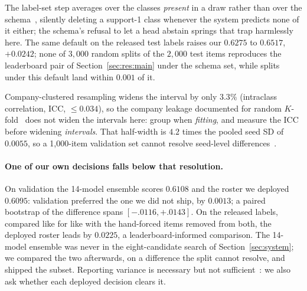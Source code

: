 The label-set step averages over the classes \emph{present} in a draw rather than over the
schema~\cite{opitz2019macro}, silently deleting a support-1 class whenever the system predicts
none of it either; the schema's refusal to let a head abstain springs that trap harmlessly here.
The same default on the released test labels raises our
$0.6275$ to $0.6517$, $+0.0242$; none of $3{,}000$ random splits of the $2{,}000$ test items
reproduces the leaderboard pair of Section~\ref{sec:res:main} under the schema set, while splits
under this default land within $0.001$ of it.

Company-clustered resampling widens the interval by only $3.3\%$ (intraclass correlation, ICC, $\le 0.034$), so the
company leakage documented for random $K$-fold~\cite{gorman2019standard} does not widen the intervals here: group
when \emph{fitting}, and measure the ICC before widening \emph{intervals}. That half-width is
$4.2$ times the pooled seed SD of $0.0055$, so a 1{,}000-item validation set cannot resolve
seed-level differences~\cite{dodge2019showwork}.

\paragraph{One of our own decisions falls below that resolution.}
On validation the 14-model ensemble scores $0.6108$ and the roster we deployed $0.6095$:
validation preferred the one we did not ship, by $0.0013$; a paired bootstrap of the difference spans $[-.0116,+.0143]$. On
the released labels, compared like for like with the hand-forced items removed from both, the
deployed roster leads by $0.0225$, a leaderboard-informed comparison. The 14-model ensemble was never in the eight-candidate search
of Section~\ref{sec:system}; we compared the two afterwards, on a difference the split cannot
resolve, and shipped the subset. Reporting variance is necessary but not
sufficient~\cite{leesombatwathana2025cscu}: we also ask whether each deployed decision clears it.

